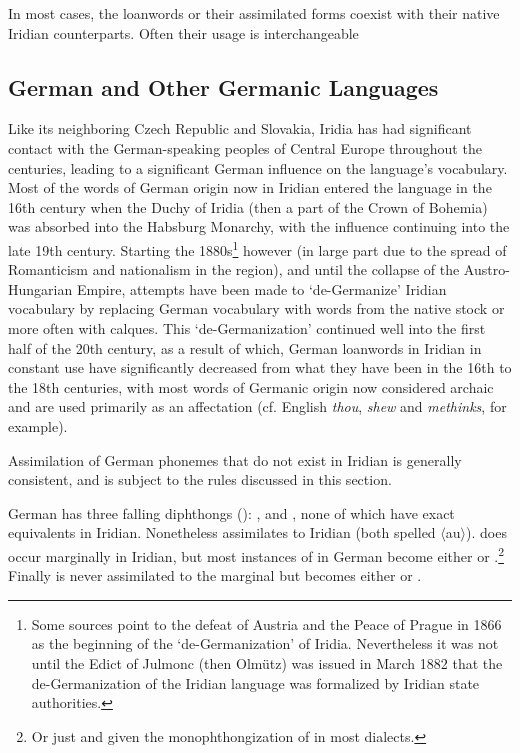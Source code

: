 In most cases, the loanwords or their assimilated forms coexist with their native Iridian counterparts. Often their usage is interchangeable

\subsection{German and Other Germanic Languages}

Like its neighboring Czech Republic and Slovakia, Iridia has had significant contact with the German-speaking peoples of Central Europe throughout the centuries, leading to a significant German influence on the language's vocabulary. Most of the words of German origin now in Iridian entered the language in the 16th century when the Duchy of Iridia (then a part of the Crown of Bohemia) was absorbed into the Habsburg Monarchy, with the influence continuing into the late 19th century. Starting the 1880s\footnote{Some sources point to the defeat of Austria and the Peace of Prague in 1866 as the beginning of the `de-Germanization' of Iridia. Nevertheless it was not until the Edict of Julmonc (then Olm\"utz) was issued in March 1882 that the de-Germanization of the Iridian language was formalized by Iridian state authorities.} however (in large part due to the spread of Romanticism and nationalism in the region), and until the collapse of the Austro-Hungarian Empire, attempts have been made to `de-Germanize' Iridian vocabulary by replacing German vocabulary with words from the native stock or more often with calques. This `de-Germanization' continued well into the first half of the 20th century, as a result of which, German loanwords in Iridian in constant use have significantly decreased from what they have been in the 16th to the 18th centuries, with most words of Germanic origin now considered archaic and are used primarily as an affectation (cf. English \emph{thou}, \emph{shew} and \emph{methinks}, for example).

Assimilation of German phonemes that do not exist in Iridian is generally consistent, and is subject to the rules discussed in this section.

German has three falling diphthongs (\cite{wiese1996}): ,  and , none of which have exact equivalents in Iridian. Nonetheless  assimilates to Iridian  (both spelled $\langle$au$\rangle$).  does occur marginally in Iridian, but most instances of  in German become either  or .\footnote{Or just  and  given the monophthongization of  in most dialects.} Finally  is never assimilated to the marginal  but becomes either  or .


